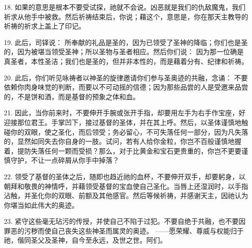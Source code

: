 18.  如果的意思是根本不要受试探，祂就不会说。凶恶就是我们的仇敌魔鬼，我们祈求从他手中被救。然后祈祷结束后，你说；藉这个，意思是，你在那天主教导的祈祷的祈求上盖上了印记。\par

19. 此后，司铎说： 所奉献的礼品是圣的，因为已领受了圣神的降临；你们也是圣的，因为被堪当领受圣神；所以圣物与圣者相应。然后你们说： 因为那一位确是真圣者，本性圣洁；我们也是圣的，但并非本性的，而是藉着分有、纪律和祈祷。\par

20. 此后，你们听见咏祷者以神圣的旋律邀请你们参与圣奥迹的共融，念诵： 不要依赖你肉身味觉的判断，而要以不可动摇的信德；因为那些品尝的人是受邀来品尝的，不是饼和酒，而是基督的预象之体和血。\par

21. 因此，当你前来时，不要伸开手腕或张开手指，却要用左手为右手作宝座，好迎接那位君王。手掌凹下，接过基督的圣体，并在其上呼。然后，以圣体谨慎地触碰你的双眼，使之圣化，而后领受；务必留心，不可失落任何一部分，因为凡失落的，显然如同失去你自身的一肢。试问，若有人给你金粒，你岂不百般谨慎地握着，提防失落任何一颗而受损？那么，对于比黄金和宝石更贵重的，你岂不更要谨慎守护，不让一点碎屑从你手中掉落？\par

22. 领受了基督的圣体之后，随即也趋近祂的血杯，不要伸开双手，却要躬身，以朝拜和敬畏的神情呼，并藉领受基督的宝血使自己圣化。当唇上还湿润时，以手指沾触，并圣化你的双眼、前额及其他感官。然后等候祈祷，并感谢天主，因祂认为你堪当如此伟大的奥迹。\par

23. 紧守这些毫无玷污的传授，并使自己不陷于过犯。不要自绝于共融，也不要因罪恶的污秽而使自己丧失这些神圣而属灵的奥迹。 ——愿荣耀、尊威与权能归于祂，偕同圣父及圣神，自今至永远，及世之世。阿们。\par

